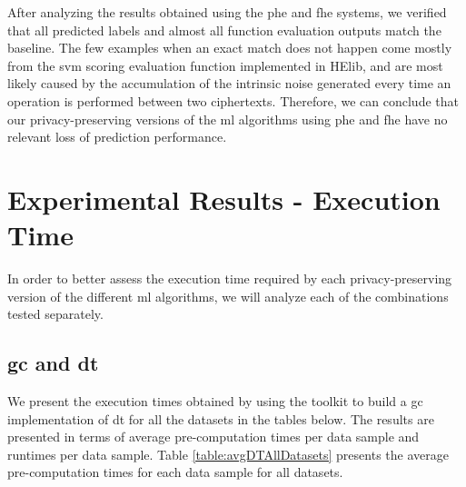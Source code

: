 After analyzing the results obtained using the \ac{phe} and \ac{fhe} systems, we verified that all predicted labels and almost all function evaluation outputs match the baseline. The few examples when an exact match does not happen come mostly from the \ac{svm} scoring evaluation function implemented in HElib, and are most likely caused by the accumulation of the intrinsic noise generated every time an operation is performed between two ciphertexts. Therefore, we can conclude that our privacy-preserving versions of the \ac{ml} algorithms using \ac{phe} and \ac{fhe} have no relevant loss of prediction performance.

\section{Experimental Results - Execution Time}
\label{sec:ExperimentalResultsExecutionTime}

In order to better assess the execution time required by each privacy-preserving version of the different \ac{ml} algorithms, we will analyze each of the combinations tested separately.


\subsection{\acl{gc} and \acl{dt}}

We present the execution times obtained by using the toolkit to build a \ac{gc} implementation of \ac{dt} for all the datasets in the tables below. The results are presented in terms of average pre-computation times per data sample and runtimes per data sample. Table \ref{table:avgDTAllDatasets} presents the average pre-computation times for each data sample for all datasets.


